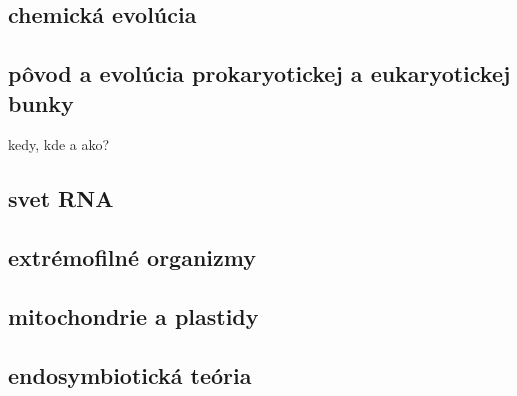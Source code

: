 \subsection{chemická evolúcia}
\subsection{pôvod a evolúcia prokaryotickej a eukaryotickej bunky}
kedy, kde a ako?\\
\subsection{svet RNA}
\subsection{extrémofilné organizmy}
\subsection{mitochondrie a plastidy}
\subsection{endosymbiotická teória}

